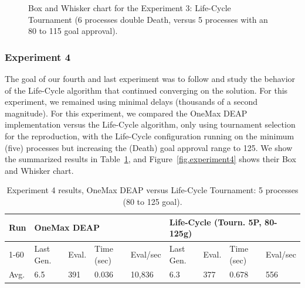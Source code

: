 \documentclass[graybox]{svmult}
\begin{document}
\begin{figure}
    \caption{Box and Whisker chart for the Experiment 3: Life-Cycle Tournament (6 processes double Death, versus 5 processes with an 80 to 115 goal approval).} \label{fig.experiment3}
    \end{figure}


\subsubsection{Experiment 4} The goal of our fourth and last experiment was to
follow and study the behavior of the Life-Cycle algorithm that continued
converging on the solution. For this experiment, we remained using minimal
delays (thousands of a second magnitude). For this experiment, we compared the
OneMax DEAP implementation versus the Life-Cycle algorithm, only using
tournament selection for the reproduction, with the Life-Cycle configuration
running on the minimum (five) processes but increasing the (Death) goal
approval range to 125. We show the summarized results in
Table~\ref{tab.experiment4}, and Figure~\ref{fig.experiment4} shows their Box
and Whisker chart.

\begin{table}[]
    \centering        
    \caption{Experiment 4 results, OneMax DEAP versus Life-Cycle Tournament: 5 processes (80 to 125 goal).}\label{tab.experiment4}
    \begin{tabular}{|l|l|l|l|l|l|l|l|l|}
    \hline
    Run & \multicolumn{4}{l|}{OneMax DEAP} & \multicolumn{4}{l|}{Life-Cycle (Tourn. 5P, 80-125g)} \\ \hline
    1-60 & Last Gen. & Eval. & Time (sec) & Eval/sec & Last Gen. & Eval. & Time (sec) & Eval/sec \\ \hline
    Avg. & 6.5 & 391 & 0.036 & 10,836 & 6.3 & 377 & 0.678 & 556 \\ \hline
    \end{tabular}
    \end{table}
\end{document}

